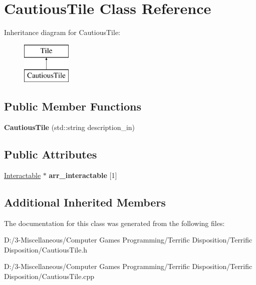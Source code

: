 \hypertarget{class_cautious_tile}{}\section{Cautious\+Tile Class Reference}
\label{class_cautious_tile}
Inheritance diagram for Cautious\+Tile\+:\begin{figure}[H]
\begin{center}
\leavevmode
\includegraphics[height=2.000000cm]{class_cautious_tile}
\end{center}
\end{figure}
\subsection*{Public Member Functions}
\begin{DoxyCompactItemize}
\item 
\mbox{\label{class_cautious_tile_ae81cd830a44593c94d72bf300d9cd376}} 
{\bfseries Cautious\+Tile} (std\+::string description\+\_\+in)
\end{DoxyCompactItemize}
\subsection*{Public Attributes}
\begin{DoxyCompactItemize}
\item 
\mbox{\label{class_cautious_tile_acaa273a5fe93ea116b2853873db64eb7}} 
\hyperlink{class_interactable}{Interactable} $\ast$ {\bfseries arr\+\_\+interactable} \mbox{[}1\mbox{]}
\end{DoxyCompactItemize}
\subsection*{Additional Inherited Members}


The documentation for this class was generated from the following files\+:\begin{DoxyCompactItemize}
\item 
D\+:/3-\/\+Miscellaneous/\+Computer Games Programming/\+Terrific Disposition/\+Terrific Disposition/Cautious\+Tile.\+h\item 
D\+:/3-\/\+Miscellaneous/\+Computer Games Programming/\+Terrific Disposition/\+Terrific Disposition/Cautious\+Tile.\+cpp\end{DoxyCompactItemize}
